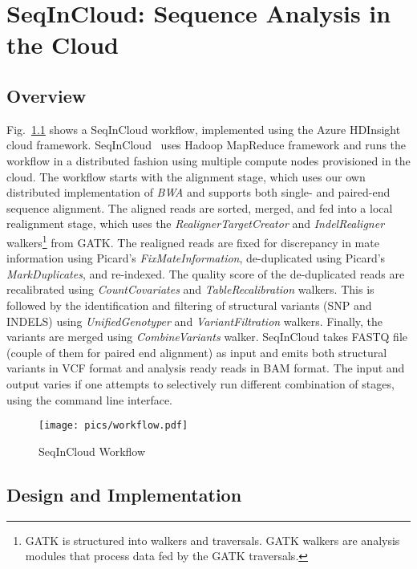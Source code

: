 \chapter{SeqInCloud: Sequence Analysis in the Cloud}
\section{Overview}
\label{sec:methodology}

Fig.~\ref{fig:workflow} shows a SeqInCloud workflow, implemented using the Azure HDInsight cloud framework. SeqInCloud~\cite{seqincloud} uses Hadoop MapReduce framework and runs the workflow in a distributed fashion using multiple compute nodes provisioned in the cloud. The workflow starts with the alignment stage, which uses our own distributed implementation of \textit{BWA} and supports both single- and paired-end sequence alignment. The aligned reads are sorted, merged, and fed into a local realignment stage, which uses the \textit{RealignerTargetCreator} and \textit{IndelRealigner} walkers\footnote{GATK is structured into walkers and traversals. GATK  walkers are analysis modules that process data fed by the GATK traversals.} from GATK. The realigned reads are fixed for discrepancy in mate information using Picard's \textit{FixMateInformation}, de-duplicated using Picard's \textit{MarkDuplicates}, and re-indexed. The quality score of the de-duplicated reads are recalibrated using \textit{CountCovariates} and \textit{TableRecalibration} walkers. This is followed by the identification and filtering of structural variants (SNP and INDELS) using \textit{UnifiedGenotyper} and \textit{VariantFiltration} walkers. Finally, the variants are merged using \textit{CombineVariants} walker. SeqInCloud takes FASTQ file (couple of them for paired end alignment) as input and emits both structural variants in VCF format and analysis ready reads in BAM format. The input and output varies if one attempts to selectively run different combination of stages, using the command line interface.

\begin{figure}[!htb]
  \centering
  \texttt{[image: pics/workflow.pdf]}
  \caption{SeqInCloud Workflow}
  \label{fig:workflow}
\end{figure}

\section{Design and Implementation}

